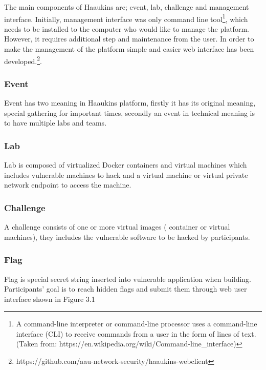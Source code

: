  The main components of Haaukins are; event, lab, challenge and management interface. Initially, management interface was only command line tool\footnote{A command-line interpreter or command-line processor uses a command-line interface (CLI) to receive commands from a user in the form of lines of text. (Taken from: https://en.wikipedia.org/wiki/Command-line_interface)}, which needs to be installed to the computer who would like to manage the platform. However, it requires additional step and maintenance from the user. In order to make the management of the platform simple and easier web interface has been developed.\footnote{https://github.com/aau-network-security/haaukins-webclient}. 
 \subsubsection{Event}
 Event has two meaning in Haaukins platform, firstly it has its original meaning, special gathering for important times, secondly an event  in technical meaning is to have multiple labs and teams. 
 
 \subsubsection{Lab}
 Lab is composed of virtualized Docker containers and virtual machines which includes vulnerable machines to hack and a virtual machine or virtual private network endpoint to access the machine. 
 
 \subsubsection{Challenge}
 A challenge consists of one or more virtual images ( container or virtual machines), they includes the vulnerable software to be hacked by participants. 
 
 \subsubsection{Flag}
 Flag is special secret string inserted into vulnerable application when building. Participants' goal is to reach hidden flags and submit them through web user interface shown in Figure 3.1 
 

